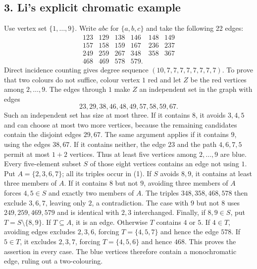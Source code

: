 \subsection*{3. Li's explicit chromatic example}
Use vertex set $\{1,\ldots,9\}$. Write $abc$ for $\{a,b,c\}$ and take the following 22 edges:
\[
\begin{array}{rrrrrr}
123&129&138&146&148&149\\
157&158&159&167&236&237\\
249&259&267&348&358&367\\
468&469&578&579.
\end{array}                                               \tag{1}
\]
Direct incidence counting gives degree sequence $(10,7,7,7,7,7,7,7,7)$.
To prove that two colours do not suffice, colour vertex $1$ red and let $Z$ be the red vertices among $2,\ldots,9$. The edges through $1$ make $Z$ an independent set in the graph with edges
\[
 23,29,38,46,48,49,57,58,59,67.                           \tag{2}
\]
Such an independent set has size at most three. If it contains $8$, it avoids $3,4,5$ and can choose at most two more vertices, because the remaining candidates contain the disjoint edges $29,67$. The same argument applies if it contains $9$, using the edges $38,67$. If it contains neither, the edge $23$ and the path $4,6,7,5$ permit at most $1+2$ vertices. Thus at least five vertices among $2,\ldots,9$ are blue.
Every five-element subset $S$ of those eight vertices contains an edge not using $1$. Put $A=\{2,3,6,7\}$; all its triples occur in (1). If $S$ avoids $8,9$, it contains at least three members of $A$. If it contains $8$ but not $9$, avoiding three members of $A$ forces $4,5\in S$ and exactly two members of $A$. The triples $348,358,468,578$ then exclude $3,6,7$, leaving only $2$, a contradiction. The case with $9$ but not $8$ uses $249,259,469,579$ and is identical with $2,3$ interchanged.
Finally, if $8,9\in S$, put $T=S\setminus\{8,9\}$. If $T\subseteq A$, it is an edge. Otherwise $T$ contains $4$ or $5$. If $4\in T$, avoiding edges excludes $2,3,6$, forcing $T=\{4,5,7\}$ and hence the edge $578$. If $5\in T$, it excludes $2,3,7$, forcing $T=\{4,5,6\}$ and hence $468$. This proves the assertion in every case. The blue vertices therefore contain a monochromatic edge, ruling out a two-colouring.
